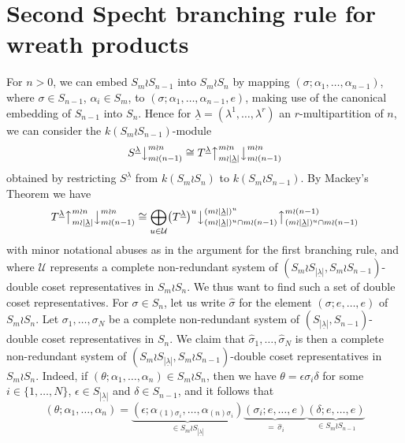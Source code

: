 \documentclass[ALCO,Unicode,published]{cedram}
\newcommand{\ul}[1]{\underline{#1}}
\begin{document}
\section{Second Specht branching rule for wreath products}
For $n>0$, we can embed $S_m \wr S_{n-1}$ into $S_m \wr S_n$ by mapping $(\sigma;\alpha_1,\ldots,\alpha_{n-1})$, where
$\sigma \in S_{n-1}$, $\alpha_i \in S_m$, to $ (\sigma;\alpha_1,\ldots,\alpha_{n-1},e)$, making use of the canonical embedding of
$S_{n-1}$ into $S_n$.
Hence for $\ul{\lambda} = (\lambda^1,\ldots,\lambda^r)$ an $r$-multipartition of $n$, we can consider the $k(S_m \wr S_{n-1})$-module
\[ S^{\ul{\lambda}}\bigr\downarrow^{m \wr n}_{m \wr (n-1)} \cong
T^{\ul{\lambda}}\bigr\uparrow^{m{\wr}n}_{m{\wr}|\ul{\lambda}|}\bigr\downarrow^{m \wr n}_{m \wr (n-1)}\]
obtained by restricting $S^{\ul{\lambda}}$ from $k(S_m \wr S_n)$ to $k(S_m \wr S_{n-1})$. By Mackey's Theorem we have
\begin{equation}\label{res_Sp_mwrnsub_mackey:eq}
T^{\ul{\lambda}}\bigr\uparrow^{m{\wr}n}_{m{\wr}|\ul{\lambda}|}\bigr\downarrow^{m \wr n}_{m \wr (n-1)}
\cong
\bigoplus_{u \in \mathcal{U}}\bigl(T^{\ul{\lambda}}\bigr)^u\bigl\downarrow^{(m{\wr}|\ul{\lambda}|)^u}_{(m{\wr}|\ul{\lambda}|)^u \cap m \wr (n-1)}
\bigl\uparrow^{m \wr (n-1)}_{(m{\wr}|\ul{\lambda}|)^u \cap m \wr (n-1)}
\end{equation}
with minor notational abuses as in the argument for the first branching rule, and where $\mathcal{U}$ represents a complete non-redundant
system of $(S_m \wr S_{|\ul{\lambda}|},S_m \wr S_{n-1})$-double coset representatives in $S_m \wr S_n$. We thus want to find such a set of
double coset representatives. For  $\sigma \in S_n$, let us write $\hat\sigma$ for the element $(\sigma;e,\ldots,e)$ of $S_m \wr S_n$.
Let $\sigma_1,\ldots,\sigma_N$ be a complete non-redundant system of $(S_{|\ul{\lambda}|},S_{n-1})$-double coset representatives in $S_n$. We
claim that $\hat\sigma_1,\ldots,\hat\sigma_N$ is then a complete non-redundant system of $(S_m \wr S_{|\ul{\lambda}|},S_m \wr S_{n-1})$-double
coset representatives in $S_m \wr S_n$. Indeed, if $(\theta;\alpha_1,\ldots,\alpha_n) \in S_m \wr S_n$, then we have
$\theta = \epsilon \sigma_i \delta$
for some $i \in \{1,\ldots,N\}$, $\epsilon \in S_{|\ul{\lambda}|}$ and $\delta \in S_{n-1}$, and it follows that
\[
(\theta;\alpha_1,\ldots,\alpha_n) =
\underbrace{(\epsilon;\alpha_{(1)\sigma_i},\ldots,\alpha_{(n)\sigma_i})}_{\in S_m \wr S_{|\ul{\lambda}|}}
\underbrace{(\sigma_i;e,\ldots,e)}_{=\,\hat\sigma_i}
\underbrace{(\delta;e,\ldots,e)}_{\in S_m \wr S_{n-1}}
\]
\end{document}
